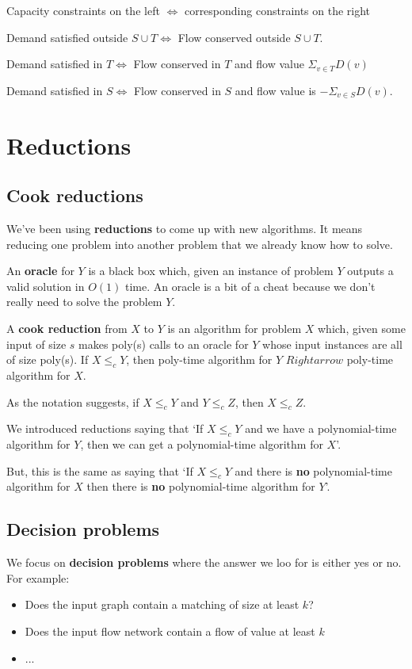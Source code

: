 \documentclass[11pt,a4paper,titlepage,dvipsnames,cmyk]{scrartcl}
\begin{document}
\begin{center}
    Capacity constraints on the left $\Leftrightarrow$ corresponding
    constraints on the right

    Demand satisfied outside $S \cup T \Leftrightarrow$ Flow conserved
    outside $S \cup T$.

    Demand satisfied in $T \Leftrightarrow$ Flow conserved in $T$ and flow
    value $\Sigma_{v \in T} D(v)$

    Demand satisfied in $S \Leftrightarrow$ Flow conserved in $S$ and flow
    value is $-\Sigma_{v \in S} D(v)$.
\end{center}

\section{Reductions}%
\label{sec:Reductions}

\subsection{Cook reductions}%
\label{sub:cook-reductions}
We've been using \textbf{reductions} to come up with new algorithms. It
means reducing one problem into another problem that we already know how
to solve.

An \textbf{oracle} for $Y$ is a black box which, given an instance of
problem $Y$ outputs a valid solution in $O(1)$ time. An oracle is a bit of
a cheat because we don't really need to solve the problem $Y$. 

A \textbf{cook reduction} from $X$ to $Y$ is an algorithm for problem $X$
which, given some input of size $s$ makes poly(s) calls to an oracle for $Y$
whose input instances are all of size poly(s). If $X \le_c Y$, then
poly-time algorithm for $Y$ $Rightarrow$ poly-time algorithm for $X$.

As the notation suggests, if $X \le_c Y$ and $Y \le_c Z$, then $X \le_c
Z$.

We introduced reductions saying that `If $X \le_c Y$ and we have a
polynomial-time algorithm for $Y$, then we can get a polynomial-time
algorithm for $X$'.

But, this is the same as saying that `If $X \le_c Y$ and there is
\textbf{no} polynomial-time algorithm for $X$ then there is \textbf{no}
polynomial-time algorithm for $Y$'.

\subsection{Decision problems}%
\label{sub:decision-problems}
We focus on \textbf{decision problems} where the answer we loo for is
either yes or no. For example:
\begin{itemize}
    \item Does the input graph contain a matching of size at least $k$?
    \item Does the input flow network contain a flow of value at least $k$
    \item ...
\end{itemize}
\end{document}
